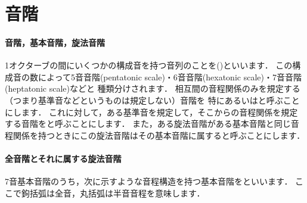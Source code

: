 \documentclass[dvipdfmx,uplatex,b5paper,openany,jbase=12Q,nomag*,textwidth-limit=44%
               ]{gachimuchi}[2020/05/05]
\begin{document}
\begin{comment}
\section{音程}
2つの音があるときに，その高さの隔たりを音程と呼びます．
ある音ともう一つの音があるとき，その幹音同士が何個の幹音にまたがっているかを数字で表して音程を表すことがあります．
この表示を\KeyBF{度数}と言って，幹音が同じ2音であれば1度または同度音程と呼びます．

音程がオクターブ（完全8度）以内であるときはこの音程を\KeyBF{単音程}と呼び，
増8度以上の場合は\KeyBF{複音程}と呼びます．

音程は度数と2音を隔てる半音数によって名称が決まります．
それぞれ半音数が少ないものから次のようになります．
\begin{description}
  \item[1，4，5，8度] 重減，減，\fbox{完全}，増，重増
  \item[2，3，6，7度] 重減，減，\fbox{短}，\fbox{長}，増，重増
\end{description}

Cの音から見た上方の各幹音の音程は全て長音程または完全音程であり
Cの音から見た下方の各幹音の音程は全て短音程または完全音程であって，
これよりも音程が狭いか広いかで名称を変えることで音程を確認することができます．

\end{comment}
\section{音階}%
\paragraph{音階，基本音階，旋法音階}
1オクターブの間にいくつかの構成音を持つ音列のことを\xkanjispace()といいます．
この構成音の数によって5音音階(pentatonic scale)・6音音階(hexatonic scale)・7音音階(heptatonic scale)などと
種類分けされます．
相互間の音程関係のみを規定する（つまり基準音などというものは規定しない）音階を
特にあるいはと呼ぶことにします．
これに対して，ある基準音を規定して，そこからの音程関係を規定する音階をと呼ぶことにします．
また，ある旋法音階がある基本音階と同じ音程関係を持つときにこの旋法音階はその基本音階に属すると呼ぶことにします．

\paragraph{全音階とそれに属する旋法音階}
7音基本音階のうち，次に示すような音程構造を持つ基本音階をといいます．
ここで鉤括弧は全音，丸括弧は半音音程を意味します．
\end{document}
